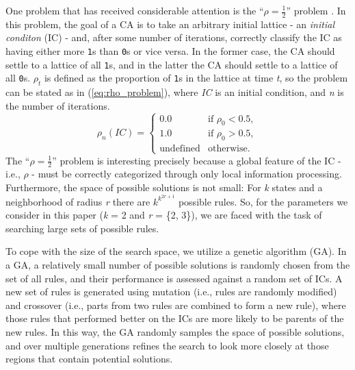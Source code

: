 One problem that has received considerable attention is the ``$\rho = \frac{1}{2}$'' problem \cite{Mitchell:1994:ECA:186092.186116}. In this problem, 
the goal of a CA is to take an arbitrary initial lattice - an \textit{initial conditon} (IC) - and, after some number of iterations, correctly classify the 
IC as having either more \texttt{1}s than \texttt{0}s or vice versa. In the former case, the CA should settle to a lattice of all 
\texttt{1}s, and in the latter the CA should settle to a lattice of all \texttt{0}s. $\rho_t$ is defined as the proportion of 
\texttt{1}s in the lattice at time \textit{t}, so the problem can be stated as in (\ref{eq:rho_problem}), where \textit{IC} is an initial condition, and \textit{n} is the number of iterations.
\begin{equation} \label{eq:rho_problem}
  \rho_n(IC) =
  \begin{cases}
    0.0 & \text{if } \rho_0 < 0.5,
    \\
    1.0 & \text{if } \rho_0 > 0.5,
   \\
    \text{undefined} & \text{otherwise}.
  \end{cases}
\end{equation}
The ``$\rho = \frac{1}{2}$'' problem is interesting precisely because a global feature of the IC - i.e., $\rho$ - must be correctly categorized through only 
local information processing. Furthermore, the space of possible solutions is not small: For \textit{k} states and a neighborhood of radius \textit{r} there are $k^{k^{2r+1}}$ possible rules. So, for the parameters we consider in this paper (\textit{k} = 2 and \textit{r} = \{2, 3\}), we are faced with the task of searching large sets of possible rules. 

To cope with the size of the search space, we utilize a genetic algorithm (GA). In a GA, a relatively small number of possible solutions is randomly chosen from 
the set of all rules, and their performance is assessed against a random set of ICs. A new set of rules is generated using mutation (i.e., rules are randomly modified) and crossover (i.e., parts from two rules are combined to form a new rule), where those rules that performed better on the ICs are more likely to be parents of the new rules. In this way, the GA randomly samples the space of possible solutions, and over multiple generations refines the search to look more closely at those regions that contain potential solutions.

